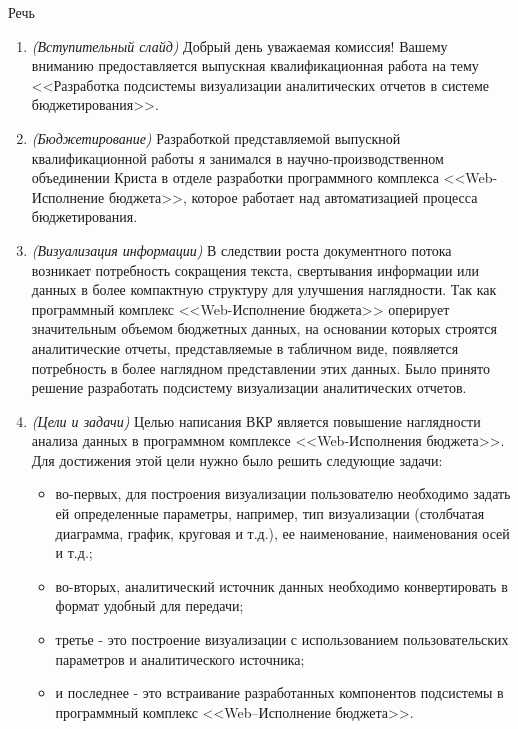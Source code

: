 \documentclass[a4paper]{extarticle}
\begin{document}
\begin{center}
    \Large Речь
\end{center}

\begin{enumerate}[label=\textbf{\arabic*})]
    \item \textit{(Вступительный слайд)} Добрый день уважаемая комиссия! Вашему вниманию пре\-доставляется выпускная квалификационная работа на тему <<Разработка подсистемы визуализации аналитических отчетов в системе бюджетирования>>.
    \item \textit{(Бюджетирование)} Разработкой представляемой выпускной квалификационной работы я занимался в научно-произ\-водственном объединении Криста в отделе разработки программного комплекса \-<<Web-Исполнение бюджета>>, которое работает над автоматизацией процесса бюджетирования. %
    \item \textit{(Визуализация информации)} В следствии роста документного потока возникает потребность сокращения текста, свертывания информации или данных в более компактную структуру для улучшения наглядности. Так как программный комплекс <<Web-Исполнение бюджета>> оперирует значительным объемом бюджетных данных, на основании которых строятся аналитические отчеты, представляемые в табличном виде, появляется потребность в более наглядном представлении этих данных. Было принято решение разработать подсистему визуализации аналитических отчетов.
    \item \textit{(Цели и задачи)} Целью написания ВКР является повышение наглядности анализа данных в программном комплексе <<Web-Исполнения бюджета>>. Для достижения этой цели нужно было решить следующие задачи:
        \begin{itemize}
            \item во-первых, для построения визуализации пользователю необходимо задать ей определенные параметры, например, тип визуализации (столбчатая диаграмма, график, круговая и т.д.), ее наименование, наименования осей и т.д.;
            \item во-вторых, аналитический источник данных необходимо конвертировать в формат удобный для передачи;
            \item третье - это построение визуализации с использованием пользовательских параметров и аналитического источника;
            \item и последнее - это встраивание разработанных компонентов подсистемы в программный комплекс <<Web–Исполнение бюджета>>.

\end{itemize}
\end{enumerate}
\end{document}
